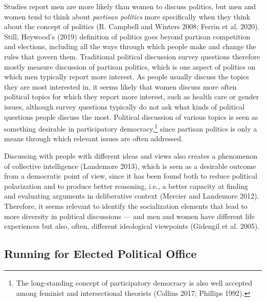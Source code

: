 \documentclass[
  letterpaper,
  DIV=11,
  numbers=noendperiod]{scrreprt}
\begin{document}
Studies report men are more likely than women to discuss politics, but
men and women tend to think about \emph{partisan politics} more
specifically when they think about the concept of politics (R. Campbell
and Winters 2008; Ferrin et al. 2020). Still, Heywood's (2019)
definition of politics goes beyond partisan competition and elections,
including all the ways through which people make and change the rules
that govern them. Traditional political discussion survey questions
therefore mostly measure discussion of partisan politics, which is one
aspect of politics on which men typically report more interest. As
people usually discuss the topics they are most interested in, it seems
likely that women discuss more often political topics for which they
report more interest, such as health care or gender issues, although
survey questions typically do not ask what kinds of political questions
people discuss the most. Political discussion of various topics is seen
as something desirable in participatory democracy,\footnote{The
  long-standing concept of participatory democracy is also well accepted
  among feminist and intersectional theorists (Collins 2017; Phillips
  1992).} since partisan politics is only a means through which relevant
issues are often addressed.

Discussing with people with different ideas and views also creates a
phenomenon of collective intelligence (Landemore 2013), which is seen as
a desirable outcome from a democratic point of view, since it has been
found both to reduce political polarization and to produce better
reasoning, i.e., a better capacity at finding and evaluating arguments
in deliberative context (Mercier and Landemore 2012). Therefore, it
seems relevant to identify the socialization elements that lead to more
diversity in political discussions --- and men and women have different
life experiences but also, often, different ideological viewpoints
(Gidengil et al. 2005).

\hypertarget{running-for-elected-political-office}{%
\subsection{Running for Elected Political
Office}\label{running-for-elected-political-office}}
\end{document}
